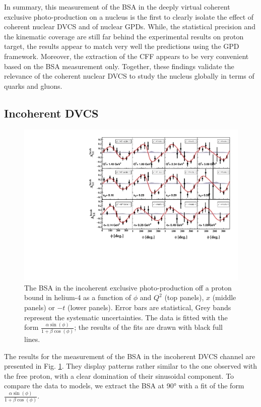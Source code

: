 \documentclass[aps,prc,preprint,superscriptaddress]{revtex4}
\begin{document}
In summary, this measurement of the BSA in the deeply virtual coherent exclusive 
photo-production on a nucleus is the first to clearly isolate the effect of 
coherent nuclear DVCS and of nuclear GPDs. While, the statistical precision and 
the kinematic coverage are still far behind the experimental results on
proton target, the results appear to match very well the predictions using the GPD 
framework. Moreover, the extraction of the CFF appears to be very convenient based
on the BSA measurement only. Together, these findings  validate the relevance of the 
coherent nuclear DVCS to study the nucleus globally in terms of quarks and 
gluons. 

\subsection{Incoherent DVCS}

\begin{figure}[bp!]
\center
\includegraphics[width=15cm]{fig3/incoherent_ALU_phi.pdf}
	\caption{The BSA in the incoherent exclusive photo-production off a proton bound in
	helium-4 as a function of $\phi$ and $Q^2$ 
	(top panels), $x$ (middle panels) or $-t$ (lower panels). Error bars are  
	statistical, Grey bands represent the systematic uncertainties. The data is fitted with the 
	form $\frac{\alpha \sin(\phi)}{1+\beta \cos(\phi)}$; the results of the 
	fits are drawn with black full lines.}
\label{fig:InCohALUphi}
\end{figure}

The results for the measurement of the BSA in the incoherent DVCS channel are presented in
Fig. \ref{fig:InCohALUphi}. They display patterns rather similar to the one observed with the 
free proton, with a clear domination of their sinusoidal component. To compare the data to 
models, we extract the BSA at 90° with a fit of the form $\frac{\alpha \sin(\phi)}{1+\beta \cos(\phi)}$. 
\end{document}
